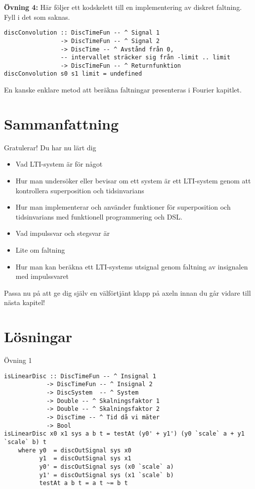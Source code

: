 \documentclass{article}
\begin{document}
\textbf{Övning 4:}
Här följer ett kodskelett till en implementering av diskret faltning. Fyll i det som saknas.
\begin{verbatim}
discConvolution :: DiscTimeFun -- ^ Signal 1
                -> DiscTimeFun -- ^ Signal 2
                -> DiscTime -- ^ Avstånd från 0,
                -- intervallet sträcker sig från -limit .. limit
                -> DiscTimeFun -- ^ Returnfunktion
discConvolution s0 s1 limit = undefined
\end{verbatim}
En kanske enklare metod att beräkna faltningar presenteras i Fourier kapitlet.
\newpage

\section{Sammanfattning}
Gratulerar! Du har nu lärt dig
\begin{itemize}
\item Vad LTI-system är för något
\item Hur man undersöker eller bevisar om ett system är ett LTI-system genom att kontrollera superposition och tidsinvarians
\item Hur man implementerar och använder funktioner för superposition och tidsinvarians med funktionell programmering och DSL.
\item Vad impulssvar och stegsvar är
\item Lite om faltning
\item Hur man kan beräkna ett LTI-systems utsignal genom faltning av insignalen med impulssvaret
\end{itemize}
Passa nu på att ge dig själv en välförtjänt klapp på axeln innan du går vidare till nästa kapitel!


\section{Lösningar}

Övning 1
\begin{verbatim}
isLinearDisc :: DiscTimeFun -- ^ Insignal 1
            -> DiscTimeFun -- ^ Insignal 2
            -> DiscSystem  -- ^ System
            -> Double -- ^ Skalningsfaktor 1
            -> Double -- ^ Skalningsfaktor 2
            -> DiscTime -- ^ Tid då vi mäter
            -> Bool
isLinearDisc x0 x1 sys a b t = testAt (y0' + y1') (y0 `scale` a + y1 `scale` b) t
    where y0  = discOutSignal sys x0
          y1  = discOutSignal sys x1
          y0' = discOutSignal sys (x0 `scale` a)
          y1' = discOutSignal sys (x1 `scale` b)
          testAt a b t = a t ~= b t
\end{verbatim}
\end{document}
